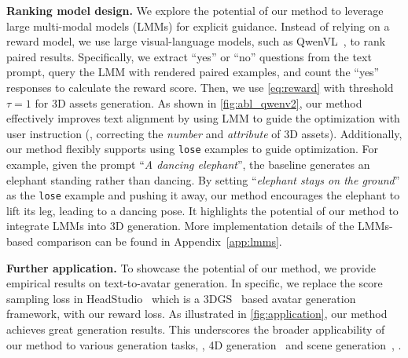 \textbf{Ranking model design.} We explore the potential of our method to leverage large multi-modal models (LMMs) for explicit guidance. Instead of relying on a reward model, we use large visual-language models, such as QwenVL~\citep{bai2023qwen}, to rank paired results. Specifically, we extract ``yes'' or ``no'' questions from the text prompt, query the LMM with rendered paired examples, and count the ``yes'' responses to calculate the reward score. 
Then, we use \cref{eq:reward} with threshold $\tau = 1$ for 3D assets generation.
As shown in \cref{fig:abl_qwenv2}, our method effectively improves text alignment by using LMM to guide the optimization with user instruction (\eg, correcting the \textit{number} and \textit{attribute} of 3D assets). Additionally, our method flexibly supports using \texttt{lose} examples to guide optimization. 
For example, given the prompt ``\textit{A dancing elephant}'', the baseline generates an elephant standing rather than dancing. 
By setting ``\textit{elephant stays on the ground}'' as the \texttt{lose} example and pushing it away, our method encourages the elephant to lift its leg, leading to a dancing pose. It highlights the potential of our method to integrate LMMs into 3D generation.
More implementation details of the LMMs-based comparison can be found in Appendix~\ref{app:lmms}.


\textbf{Further application.} 
To showcase the potential of our method, we provide empirical results on text-to-avatar generation. In specific, we replace the score sampling loss in HeadStudio~\citep{zhou2024headstudio} which is a 3DGS~\citep{kerbl3Dgaussians} based avatar generation framework, with our reward loss. 
As illustrated in \cref{fig:application}, our method achieves great generation results. This underscores the broader applicability of our method to various generation tasks, \eg, 4D generation~\citep{bahmani20244d} and scene generation~\citep{zhang2024text2nerf}, \etc.

